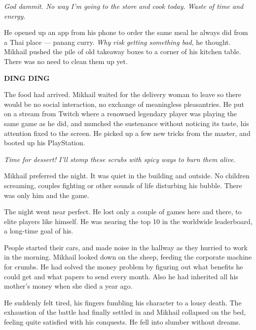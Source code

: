 \textit{God dammit. No way I’m going to the store and cook today. Waste of time and energy.}

He opened up an app from his phone to order the same meal he always did from a Thai place — panang curry. \textit{Why risk getting something bad}, he thought. Mikhail pushed the pile of old takeaway boxes to a corner of his kitchen table. There was no need to clean them up yet.

\begin{center}
\textbf{DING DING}
\end{center}

The food had arrived. Mikhail waited for the delivery woman to leave so there would be no social interaction, no exchange of meaningless pleasantries. He put on a stream from Twitch where a renowned legendary player was playing the same game as he did, and munched the sustenance without noticing its taste, his attention fixed to the screen. He picked up a few new tricks from the master, and booted up his PlayStation.

\textit{Time for dessert! I’ll stomp these scrubs with spicy ways to burn them alive. }

Mikhail preferred the night. It was quiet in the building and outside. No children screaming, couples fighting or other sounds of life disturbing his bubble. There was only him and the game.

The night went near perfect. He lost only a couple of games here and there, to elite players like himself. He was nearing the top 10 in the worldwide leaderboard, a long-time goal of his.

People started their cars, and made noise in the hallway as they hurried to work in the morning. Mikhail looked down on the sheep, feeding the corporate machine for crumbs. He had solved the money problem by figuring out what benefits he could get and what papers to send every month. Also he had inherited all his mother’s money when she died a year ago. 

He suddenly felt tired, his fingers fumbling his character to a lousy death. The exhaustion of the battle had finally settled in and Mikhail collapsed on the bed, feeling quite satisfied with his conquests. He fell into slumber without dreams.
